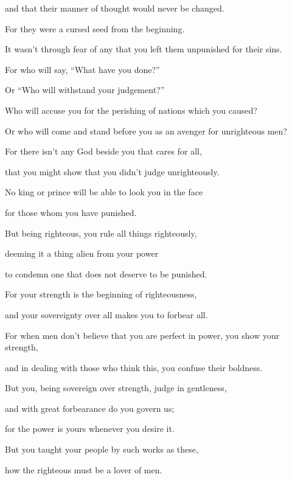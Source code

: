 {\par }{\QB and that their manner of thought would never be changed.
\par }{\Q {}For they were a cursed seed from the beginning.
\par }{\QB It wasn’t through fear of any that you left them unpunished for their sins.
\par }{\BB \par }{\Q {}For who will say, “What have you done?”
\par }{\QB Or “Who will withstand your judgement?”
\par }{\Q Who will accuse you for the perishing of nations which you caused?
\par }{\QB Or who will come and stand before you as an avenger for unrighteous men?
\par }{\Q {}For there isn’t any God beside you that cares for all,
\par }{\QB that you might show that you didn’t judge unrighteously.
\par }{\Q {}No king or prince will be able to look you in the face
\par }{\QB for those whom you have punished.
\par }{\Q {}But being righteous, you rule all things righteously,
\par }{\QB deeming it a thing alien from your power
\par }{\QB to condemn one that does not deserve to be punished.
\par }{\Q {}For your strength is the beginning of righteousness,
\par }{\QB and your sovereignty over all makes you to forbear all.
\par }{\Q {}For when men don’t believe that you are perfect in power, you show your strength,
\par }{\QB {}and in dealing with those who think this, you confuse their boldness.
\par }{\Q {}But you, being sovereign over strength, judge in gentleness,
\par }{\QB and with great forbearance do you govern us;
\par }{\QB for the power is yours whenever you desire it.
\par }{\BB \par }{\Q {}But you taught your people by such works as these,
\par }{\QB how the righteous must be a lover of men.
}
